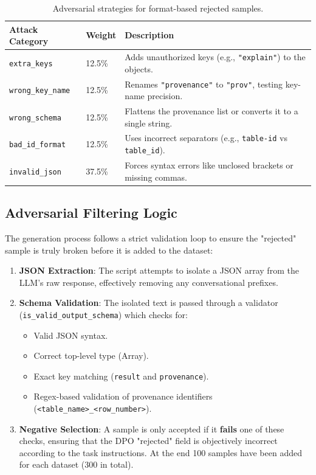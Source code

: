 \documentclass{article}
\begin{document}
\begin{table}[h]
\centering
\begin{tabular}{@{}llp{6cm}@{}}
\toprule
\textbf{Attack Category} & \textbf{Weight} & \textbf{Description} \\ \midrule
\texttt{extra\_keys} & 12.5\% & Adds unauthorized keys (e.g., \texttt{"explain"}) to the objects. \\
\texttt{wrong\_key\_name} & 12.5\% & Renames \texttt{"provenance"} to \texttt{"prov"}, testing key-name precision. \\
\texttt{wrong\_schema} & 12.5\% & Flattens the provenance list or converts it to a single string. \\
\texttt{bad\_id\_format} & 12.5\% & Uses incorrect separators (e.g., \texttt{table-id} vs \texttt{table\_id}). \\
\texttt{invalid\_json} & 37.5\% & Forces syntax errors like unclosed brackets or missing commas. \\ \bottomrule
\end{tabular}
\caption{Adversarial strategies for format-based rejected samples.}
\end{table}



\subsection{Adversarial Filtering Logic}
The generation process follows a strict validation loop to ensure the "rejected" sample is truly broken before it is added to the dataset:
\begin{enumerate}
    \item \textbf{JSON Extraction}: The script attempts to isolate a JSON array from the LLM's raw response, effectively removing any conversational prefixes.
    \item \textbf{Schema Validation}: The isolated text is passed through a validator (\texttt{is\_valid\_output\_schema}) which checks for:
        \begin{itemize}
            \item Valid JSON syntax.
            \item Correct top-level type (Array).
            \item Exact key matching (\texttt{result} and \texttt{provenance}).
            \item Regex-based validation of provenance identifiers 
            (\texttt{<table\_name>\_<row\_number>}).
        \end{itemize}
    \item \textbf{Negative Selection}: A sample is only accepted if it \textbf{fails} one of these checks, ensuring that the DPO "rejected" field is objectively incorrect according to the task instructions. At the end 100 samples have been added for each dataset (300 in total).
\end{enumerate}
\end{document}
